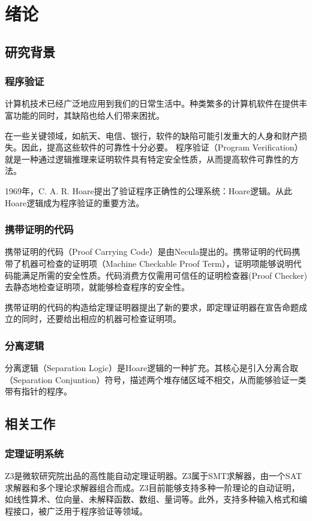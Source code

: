 \chapter{绪论}
\label{chap:intro}

\section{研究背景}
\subsection{程序验证}
计算机技术已经广泛地应用到我们的日常生活中。种类繁多的计算机软件在提供丰富功能的同时，其缺陷也给人们带来困扰。

在一些关键领域，如航天、电信、银行，软件的缺陷可能引发重大的人身和财产损失。因此，提高这些软件的可靠性十分必要。
程序验证（Program Verification）就是一种通过逻辑推理来证明软件具有特定安全性质，从而提高软件可靠性的方法。

1969年，C. A. R. Hoare提出了验证程序正确性的公理系统：Hoare逻辑\cite{Hoare69}。从此Hoare逻辑成为程序验证的重要方法。

\subsection{携带证明的代码}
携带证明的代码（Proof Carrying Code）\cite{Necula97}\cite{Necula98}是由Necula提出的。携带证明的代码携带了机器可检查的证明项（Machine Checkable Proof Term），证明项能够说明代码能满足所需的安全性质。代码消费方仅需用可信任的证明检查器(Proof Checker)去静态地检查证明项，就能够检查程序的安全性。

携带证明的代码的构造给定理证明器提出了新的要求，即定理证明器在宣告命题成立的同时，还要给出相应的机器可检查证明项。

\subsection{分离逻辑}
分离逻辑（Separation Logic）\cite{Reynolds02}是Hoare逻辑的一种扩充。其核心是引入分离合取（Separation Conjuntion）符号，描述两个堆存储区域不相交，从而能够验证一类带有指针的程序。

\section{相关工作}
\subsection{定理证明系统}
Z3\cite{z3}\cite{DeMoura:2008:ZES:1792734.1792766}是微软研究院出品的高性能自动定理证明器。Z3属于SMT求解器，由一个SAT求解器和多个理论求解器组合而成。Z3目前能够支持多种一阶理论的自动证明，如线性算术、位向量、未解释函数、数组、量词等。此外，支持多种输入格式和编程接口，被广泛用于程序验证等领域。

